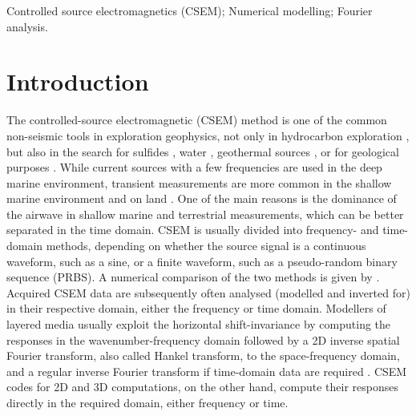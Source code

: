 \documentclass[extra, camera,%
    onecolumn,   %
    referee,     %
]{gji}
\begin{document}
\begin{keywords}
  Controlled source electromagnetics (CSEM); Numerical modelling; Fourier
  analysis.
\end{keywords}

\section{Introduction}  %

The controlled-source electromagnetic (CSEM) method is one of the common
non-seismic tools in exploration geophysics, not only in hydrocarbon
exploration \citep{GEO.10.Constable}, but also in the search for sulfides
\citep{GRL.19.Gehrmann}, water \citep{GEO.05.Pedersen}, geothermal sources
\citep{WGC.15.Girard}, or for geological purposes \citep{NAT.19.Johanson}.
While current sources with a few frequencies are used in the deep marine
environment, transient measurements are more common in the shallow marine
environment and on land \citep[e.g., ][]{GEO.07.Ziolkowski, SEG.07.Andreis,
SEG.07.Avdeeva}. One of the main reasons is the dominance of the airwave in
shallow marine and terrestrial measurements, which can be better separated in
the time domain. CSEM is usually divided into frequency- and time-domain
methods, depending on whether the source signal is a continuous waveform, such
as a sine, or a finite waveform, such as a pseudo-random binary sequence
(PRBS). A numerical comparison of the two methods is given by
\cite{GP.13.Conell}. Acquired CSEM data are subsequently often analysed
(modelled and inverted for) in their respective domain, either the frequency or
time domain. Modellers of layered media usually exploit the horizontal
shift-invariance by computing the responses in the wavenumber-frequency domain
followed by a 2D inverse spatial Fourier transform, also called Hankel
transform, to the space-frequency domain, and a regular inverse Fourier
transform if time-domain data are required \citep[e.g., ][]{GEO.15.Hunziker}.
CSEM codes for 2D and 3D computations, on the other hand,
 compute their responses directly in the required
domain, either frequency or time.

\end{document}
